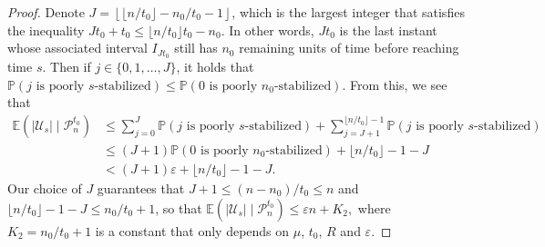 \documentclass[10pt,a4paper]{amsart}
\newcommand{\E}{\mathbb{E}}
\renewcommand{\P}{\mathbb{P}}
\begin{document}
\begin{proof}
	Denote $J=\left \lfloor \lfloor n/t_0 \rfloor- n_0/t_0-1  \right \rfloor$, which is the largest integer that satisfies the inequality $Jt_0+t_0\le \lfloor n/t_0 \rfloor t_0 - n_0$. In other words, $Jt_0$ is the last instant whose associated interval $I_{Jt_0}$ still has $n_0$ remaining units of time before reaching time $s$. Then if $j\in \{0,1,\ldots, J\}$, it holds that $  \P(j\text{ is poorly }s\text{-stabilized})\le \P(0\text{ is poorly }n_0\text{-stabilized}).$ From this, we see that
	\begin{align*}
		\E\left(|\mathcal{U}_s| \mid \mathcal{P}_n^{t_0}\right)&\le\sum_{j=0}^{J} \P(j\text{ is poorly }s\text{-stabilized})+\sum_{j=J+1}^{\lfloor n/t_0\rfloor-1}\P(j\text{ is poorly }s\text{-stabilized})\\
		&\le (J+1) \P(0\text{ is poorly }n_0\text{-stabilized})+ \lfloor n/t_0\rfloor-1 -J \\
		&< (J+1)\varepsilon +\lfloor n/t_0\rfloor-1 -J.
	\end{align*}
	Our choice of $J$ guarantees that $J+1\le (n-n_0)/t_0\le n$ and $\lfloor n/t_0\rfloor-1 -J\le n_0/t_0+1$, so that $
		\E\left(|\mathcal{U}_s| \mid \mathcal{P}_n^{t_0}\right)\le \varepsilon n + K_2,$ where $K_2=n_0/t_0+1$ is a constant that only depends on $\mu$, $t_0$, $R$ and $\varepsilon$.
\end{proof}
\end{document}
